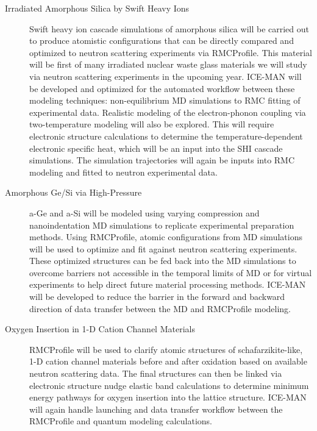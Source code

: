 \documentclass{proposalnsf}
\begin{document}
\begin{description}
\item[Irradiated Amorphous Silica by Swift Heavy Ions] Swift heavy ion cascade simulations of amorphous silica will be carried out to produce atomistic configurations that can be directly compared and optimized to neutron scattering experiments via RMCProfile. This material will be first of many irradiated nuclear waste glass materials we will study via neutron scattering experiments in the upcoming year. ICE-MAN will be developed and optimized for the automated workflow between these modeling techniques: non-equilibrium MD simulations to RMC fitting of experimental data. Realistic modeling of the electron-phonon coupling via two-temperature modeling will also be explored. This will require electronic structure calculations to determine the temperature-dependent electronic specific heat, which will be an input into the SHI cascade simulations. The simulation trajectories will again be inputs into RMC modeling and fitted to neutron experimental data. 

\item[Amorphous Ge/Si via High-Pressure] a-Ge and a-Si will be modeled using varying compression and nanoindentation MD simulations to replicate experimental preparation methods. Using RMCProfile, atomic configurations from MD simulations will be used to optimize and fit against neutron scattering experiments. These optimized structures can be fed back into the MD simulations to overcome barriers not accessible in the temporal limits of MD or for virtual experiments to help direct future material processing methods. ICE-MAN will be developed to reduce the barrier in the forward and backward direction of data transfer between the MD and RMCProfile modeling.

\item[Oxygen Insertion in 1-D Cation Channel Materials]  RMCProfile will be used to clarify atomic structures of schafarzikite-like, 1-D cation channel materials before and after oxidation based on available neutron scattering data. The final structures can then be linked via electronic structure nudge elastic band calculations to determine minimum energy pathways for oxygen insertion into the lattice structure. ICE-MAN will again handle launching and data transfer workflow between the RMCProfile and quantum modeling calculations.



\end{description} 
\end{document}
